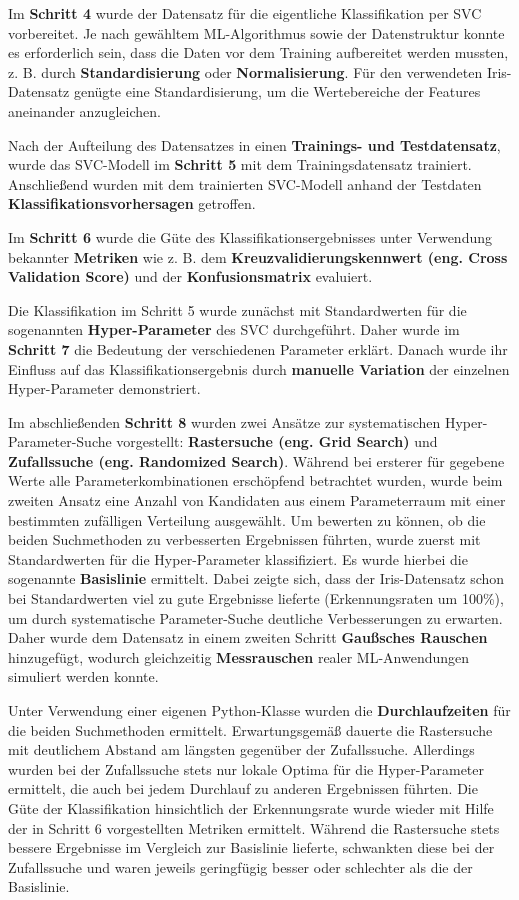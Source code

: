 \documentclass [oneside,10pt,a4paper,ngerman,BCOR10mm,headsepline,parindent,final]{scrartcl}
\begin{document}
Im \textbf{Schritt 4} wurde der Datensatz für die eigentliche
Klassifikation per SVC vorbereitet. Je nach gewähltem ML-Algorithmus
sowie der Datenstruktur konnte es erforderlich sein, dass die Daten vor
dem Training aufbereitet werden mussten, z. B. durch
\textbf{Standardisierung} oder \textbf{Normalisierung}. Für den
verwendeten Iris-Datensatz genügte eine Standardisierung, um die
Wertebereiche der Features aneinander anzugleichen.

Nach der Aufteilung des Datensatzes in einen \textbf{Trainings- und
Testdatensatz}, wurde das SVC-Modell im \textbf{Schritt 5} mit dem
Trainingsdatensatz trainiert. Anschließend wurden mit dem trainierten
SVC-Modell anhand der Testdaten \textbf{Klassifikationsvorhersagen}
getroffen.

Im \textbf{Schritt 6} wurde die Güte des Klassifikationsergebnisses
unter Verwendung bekannter \textbf{Metriken} wie z. B. dem
\textbf{Kreuzvalidierungskennwert (eng. Cross Validation Score)} und der
\textbf{Konfusionsmatrix} evaluiert.

Die Klassifikation im Schritt 5 wurde zunächst mit Standardwerten für
die sogenannten \textbf{Hyper-Parameter} des SVC durchgeführt. Daher
wurde im \textbf{Schritt 7} die Bedeutung der verschiedenen Parameter
erklärt. Danach wurde ihr Einfluss auf das Klassifikationsergebnis durch
\textbf{manuelle Variation} der einzelnen Hyper-Parameter demonstriert.

Im abschließenden \textbf{Schritt 8} wurden zwei Ansätze zur
systematischen Hyper-Parameter-Suche vorgestellt: \textbf{Rastersuche
(eng. Grid Search)} und \textbf{Zufallssuche (eng. Randomized Search)}.
Während bei ersterer für gegebene Werte alle Parameterkombinationen
erschöpfend betrachtet wurden, wurde beim zweiten Ansatz eine Anzahl von
Kandidaten aus einem Parameterraum mit einer bestimmten zufälligen
Verteilung ausgewählt. Um bewerten zu können, ob die beiden Suchmethoden
zu verbesserten Ergebnissen führten, wurde zuerst mit Standardwerten für
die Hyper-Parameter klassifiziert. Es wurde hierbei die sogenannte
\textbf{Basislinie} ermittelt. Dabei zeigte sich, dass der
Iris-Datensatz schon bei Standardwerten viel zu gute Ergebnisse lieferte
(Erkennungsraten um 100\%), um durch systematische Parameter-Suche
deutliche Verbesserungen zu erwarten. Daher wurde dem Datensatz in einem
zweiten Schritt \textbf{Gaußsches Rauschen} hinzugefügt, wodurch
gleichzeitig \textbf{Messrauschen} realer ML-Anwendungen simuliert
werden konnte.

Unter Verwendung einer eigenen Python-Klasse wurden die
\textbf{Durchlaufzeiten} für die beiden Suchmethoden ermittelt.
Erwartungsgemäß dauerte die Rastersuche mit deutlichem Abstand am
längsten gegenüber der Zufallssuche. Allerdings wurden bei der
Zufallssuche stets nur lokale Optima für die Hyper-Parameter ermittelt,
die auch bei jedem Durchlauf zu anderen Ergebnissen führten. Die Güte
der Klassifikation hinsichtlich der Erkennungsrate wurde wieder mit
Hilfe der in Schritt 6 vorgestellten Metriken ermittelt. Während die
Rastersuche stets bessere Ergebnisse im Vergleich zur Basislinie
lieferte, schwankten diese bei der Zufallssuche und waren jeweils
geringfügig besser oder schlechter als die der Basislinie.
\end{document}
